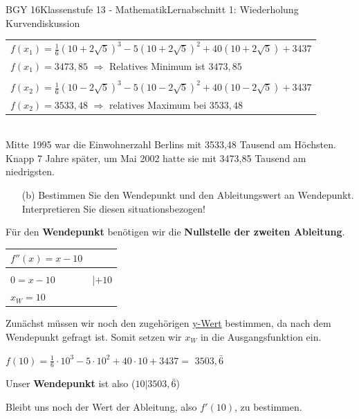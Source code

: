 \documentclass[oneside,openany,headings=optiontotoc,11pt,numbers=noenddot]{scrreprt}
\begin{document}
\begin{worksheet}{BGY 16}{Klassenstufe 13 - Mathematik}{Lernabschnitt 1: Wiederholung Kurvendiskussion}
\begin{framed}
\begin{tabularx}{\textwidth}{X}
				\(f(x_1) = \frac{1}{6}(10+2\sqrt{5})^3 - 5(10+2\sqrt{5})^2 +40(10+2\sqrt{5}) +3437\)\\
				\(f(x_1) = 3473,85\) \(\Rightarrow\) Relatives Minimum ist \colorbox{green!10}{\(3473,85\)}\\
				\hline
				\\
				\(f(x_2) = \frac{1}{6}(10-2\sqrt{5})^3 - 5(10-2\sqrt{5})^2 +40(10-2\sqrt{5}) +3437\)\\
				\(f(x_2) = 3533,48\) \(\Rightarrow\) relatives Maximum bei \colorbox{green!10}{\(3533,48\)}
			\end{tabularx}
		\\
		Mitte 1995 war die Einwohnerzahl Berlins mit \colorbox{green!10}{3533,48 Tausend} am Höchsten. Knapp 7 Jahre später, um Mai 2002 hatte sie mit \colorbox{green!10}{3473,85 Tausend} am niedrigsten.
		\end{framed}
		\newpage
		\begin{itemize}
			\item[(b)] Bestimmen Sie den Wendepunkt und den Ableitungswert an Wendepunkt.\\
			Interpretieren Sie diesen situationsbezogen!
		\end{itemize}
		\begin{framed}
			\noindent
			Für den \textbf{Wendepunkt} benötigen wir die \textbf{Nullstelle der zweiten Ableitung}.\\
			\begin{tabularx}{\textwidth}{ll}
				\(f''(x) = x-10\)\\
				\hline
				\\
				\(0 = x-10 \) & |\(+10\)\\
				\colorbox{green!10}{\(x_W = 10\)}\\
			\end{tabularx}
			Zunächst müssen wir noch den zugehörigen \underline{y-Wert} bestimmen, da nach dem Wendepunkt gefragt ist. Somit setzen wir \(x_W\) in die Ausgangsfunktion ein.\\
			\par\noindent
			\(f(10) = \frac{1}{6}\cdot{}10^3 - 5\cdot{}10^2 +40\cdot{}10 +3437 =\) \colorbox{green!10}{\(3503,\bar{6}\)}\\
			\par\noindent
			Unser \textbf{Wendepunkt} ist also \colorbox{green!10}{(\(10|3503,\bar{6}\))}\\
			\par\noindent
			Bleibt uns noch der Wert der Ableitung, also \(f'(10)\), zu bestimmen.\\

\end{framed}
\end{worksheet}
\end{document}
